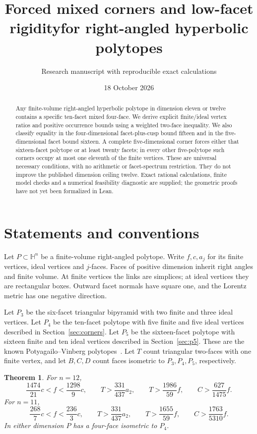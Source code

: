 \documentclass[11pt]{article}
\title{Forced mixed corners and low-facet rigidity\linebreak for right-angled hyperbolic polytopes}
\author{Research manuscript with reproducible exact calculations}
\date{18 October 2026}
\newtheorem{theorem}{Theorem}
\newcommand{\HH}{\mathbb H}
\begin{document}
\maketitle
\begin{abstract}
Any finite-volume right-angled hyperbolic polytope in dimension eleven
or twelve contains a specific ten-facet mixed four-face. We derive
explicit finite/ideal vertex ratios and positive occurrence bounds
using a weighted two-face inequality. We also classify equality in the
four-dimensional facet-plus-cusp bound fifteen and in the
five-dimensional facet bound sixteen. A complete five-dimensional
corner forces either that sixteen-facet polytope or at least twenty
facets; in every other five-polytope such corners occupy at most one
eleventh of the finite vertices. These are universal necessary
conditions, with no arithmetic or facet-spectrum restriction. They do
not improve the published dimension ceiling twelve. Exact rational
calculations, finite model checks and a numerical feasibility diagnostic
are supplied; the geometric proofs have not yet been formalized in Lean.
\end{abstract}

\section{Statements and conventions}
Let $P\subset\HH^n$ be a finite-volume right-angled polytope. Write
$f,c,a_j$ for its finite vertices, ideal vertices and $j$-faces.
Faces of positive dimension inherit right angles and finite volume.
At finite vertices the links are simplices; at ideal vertices they are
rectangular boxes. Outward facet normals have square one, and the
Lorentz metric has one negative direction.

Let $P_3$ be the six-facet triangular bipyramid with two finite and
three ideal vertices. Let $P_4$ be the ten-facet polytope with five
finite and five ideal vertices described in Section~\ref{sec:corners}.
Let $P_5$ be the sixteen-facet polytope with sixteen finite and ten
ideal vertices described in Section~\ref{sec:p5}.
These are the known Potyagailo--Vinberg polytopes~\cite{PV}.
Let $T$ count triangular two-faces with one finite vertex, and let
$B,C,D$ count faces isometric to $P_3,P_4,P_5$, respectively.

\begin{theorem}\label{thm:density}
For $n=12$,
\[
 \frac{1474}{21}c<f<\frac{1298}{9}c,\qquad
 T>\frac{331}{437}a_2,\qquad T>\frac{1986}{59}f,
 \qquad C>\frac{627}{1475}f.
\]
For $n=11$,
\[
 \frac{268}{7}c<f<\frac{236}{3}c,\qquad
 T>\frac{331}{437}a_2,\qquad T>\frac{1655}{59}f,
 \qquad C>\frac{1763}{5310}f.
\]
In either dimension $P$ has a four-face isometric to $P_4$.
\end{theorem}
\end{document}
